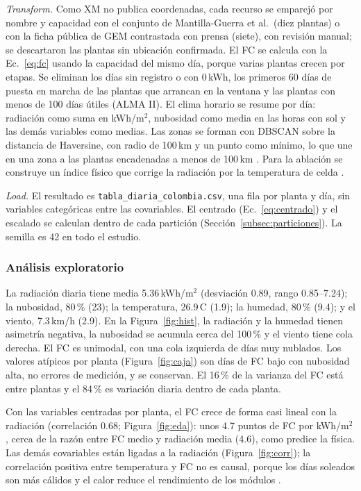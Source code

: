 \documentclass[pdflatex,sn-mathphys-num]{sn-jnl}
\begin{document}
\textit{Transform.} Como XM no publica coordenadas, cada recurso se emparejó por nombre y capacidad con el conjunto de Mantilla-Guerra et al.\ (diez plantas) o con la ficha pública de GEM contrastada con prensa (siete), con revisión manual; se descartaron las plantas sin ubicación confirmada. El FC se calcula con la Ec.~\eqref{eq:fc} usando la capacidad del mismo día, porque varias plantas crecen por etapas. Se eliminan los días sin registro o con 0\,kWh, los primeros 60 días de puesta en marcha de las plantas que arrancan en la ventana y las plantas con menos de 100 días útiles (ALMA II). El clima horario se resume por día: radiación como suma en kWh/m$^2$, nubosidad como media en las horas con sol y las demás variables como medias. Las zonas se forman con DBSCAN sobre la distancia de Haversine, con radio de 100\,km y un punto como mínimo, lo que une en una zona a las plantas encadenadas a menos de 100\,km \cite{roberts2017cv}. Para la ablación se construye un índice físico que corrige la radiación por la temperatura de celda \cite{skoplaki2009operating,skoplaki2009temperature}.

\textit{Load.} El resultado es \texttt{tabla\_diaria\_colombia.csv}, una fila por planta y día, sin variables categóricas entre las covariables. El centrado (Ec.~\ref{eq:centrado}) y el escalado se calculan dentro de cada partición (Sección~\ref{subsec:particiones}). La semilla es 42 en todo el estudio.

\subsubsection{Análisis exploratorio}

La radiación diaria tiene media 5.36\,kWh/m$^2$ (desviación 0.89, rango 0.85--7.24); la nubosidad, 80\,\% (23); la temperatura, 26.9\,\textdegree C (1.9); la humedad, 80\,\% (9.4); y el viento, 7.3\,km/h (2.9). En la Figura~\ref{fig:hist}, la radiación y la humedad tienen asimetría negativa, la nubosidad se acumula cerca del 100\,\% y el viento tiene cola derecha. El FC es unimodal, con una cola izquierda de días muy nublados. Los valores atípicos por planta (Figura~\ref{fig:caja}) son días de FC bajo con nubosidad alta, no errores de medición, y se conservan. El 16\,\% de la varianza del FC está entre plantas y el 84\,\% es variación diaria dentro de cada planta.

Con las variables centradas por planta, el FC crece de forma casi lineal con la radiación (correlación 0.68; Figura~\ref{fig:eda}): unos 4.7 puntos de FC por kWh/m$^2$, cerca de la razón entre FC medio y radiación media (4.6), como predice la física. Las demás covariables están ligadas a la radiación (Figura~\ref{fig:corr}); la correlación positiva entre temperatura y FC no es causal, porque los días soleados son más cálidos y el calor reduce el rendimiento de los módulos \cite{skoplaki2009temperature}.
\end{document}
